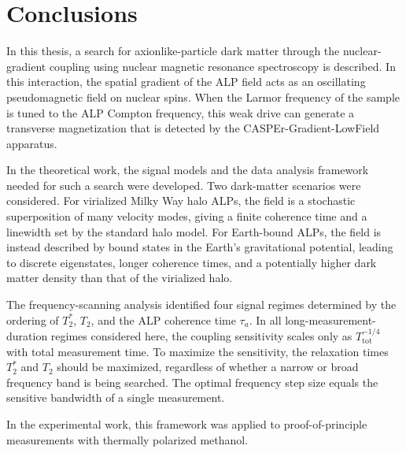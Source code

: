 \section{Conclusions}

In this thesis, a search for axionlike-particle dark matter through the nuclear-gradient coupling using nuclear magnetic resonance spectroscopy is described.
In this interaction, the spatial gradient of the ALP field acts as an oscillating pseudomagnetic field on nuclear spins.
When the Larmor frequency of the sample is tuned to the ALP Compton frequency, this weak drive can generate a transverse magnetization that is detected by the CASPEr-Gradient-LowField apparatus.

In the theoretical work, the signal models and the data analysis framework needed for such a search were developed.
Two dark-matter scenarios were considered.
For virialized Milky Way halo ALPs, the field is a stochastic superposition of many velocity modes, giving a finite coherence time and a linewidth set by the standard halo model. 
For Earth-bound ALPs, the field is instead described by bound states in the Earth's gravitational potential, leading to discrete eigenstates, longer coherence times, and a potentially higher dark matter density than that of the virialized halo.

The frequency-scanning analysis identified four signal regimes determined by the ordering of $T_2^*$, $T_2$, and the ALP coherence time $\tau_a$.
In all long-measurement-duration regimes considered here, the coupling sensitivity scales only as $T_\mathrm{tot}^{-1/4}$ with total measurement time.
To maximize the sensitivity, the relaxation times $T_2^*$ and $T_2$ should be maximized, regardless of whether a narrow or broad frequency band is being searched.
The optimal frequency step size equals the sensitive bandwidth of a single measurement.

In the experimental work, this framework was applied to proof-of-principle measurements with thermally polarized methanol.

